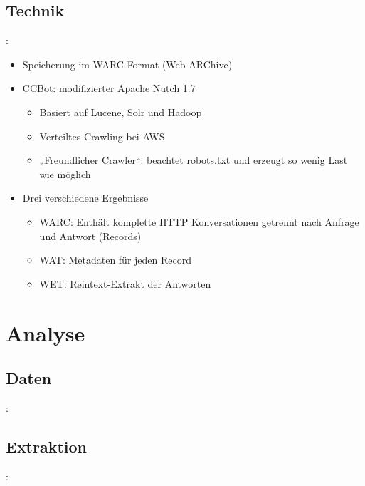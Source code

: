 \documentclass[12pt, utf8, ngerman]{beamer}
\begin{document}
\subsection{Technik}
\begin{frame}{\insertsection: \insertsubsection}
    \begin{itemize}
        \item Speicherung im WARC-Format (Web ARChive)
        \item CCBot: modifizierter Apache Nutch 1.7
            \begin{itemize}
                \item Basiert auf Lucene, Solr und Hadoop
                \item Verteiltes Crawling bei AWS
                \item „Freundlicher Crawler“: beachtet robots.txt und erzeugt so wenig Last wie möglich
            \end{itemize}
        \item Drei verschiedene Ergebnisse
            \begin{itemize}
                \item WARC: Enthält komplette HTTP Konversationen getrennt nach
                    Anfrage und Antwort (Records)
                \item WAT: Metadaten für jeden Record
                \item WET: Reintext-Extrakt der Antworten
            \end{itemize}
    \end{itemize}
\end{frame}


\section{Analyse}

\subsection{Daten}
\begin{frame}{\insertsection: \insertsubsection}
\end{frame}

\subsection{Extraktion}
\begin{frame}{\insertsection: \insertsubsection}
\end{frame}
\end{document}

